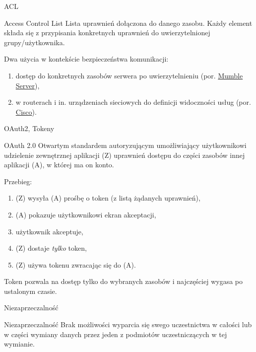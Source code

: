 \begin{frame}{ACL}
	
	\begin{alertblock}{Access Control List}
		Lista uprawnień dołączona do danego zasobu. Każdy element składa się z przypisania konkretnych uprawnień do uwierzytelnionej grupy/użytkownika.
	\end{alertblock}
	
	Dwa użycia w kontekście bezpieczeństwa komunikacji:
	\begin{enumerate}
		\item dostęp do konkretnych zasobów serwera po uwierzytelnieniu (por. \href{http://wiki.mumble.info/wiki/ACL_and_Groups/English}{Mumble Server}),
		\item w routerach i in. urządzeniach sieciowych do definicji widoczności usług (por. \href{http://www.cisco.com/c/en/us/td/docs/ios/12_2/security/configuration/guide/fsecur_c/scfacls.html}{Cisco}).
	\end{enumerate}
	
\end{frame}

\begin{frame}{OAuth2, Tokeny}
	
	\begin{alertblock}{OAuth 2.0}
		Otwartym standardem autoryzującym umożliwiający użytkownikowi udzielenie zewnętrznej aplikacji (Z) uprawnień dostępu do części zasobów innej aplikacji (A), w której ma on konto.
	\end{alertblock}
	
	Przebieg:
	\begin{enumerate}
		\item (Z) wysyła (A) prośbę o token (z listą żądanych uprawnień),
		\item (A) pokazuje użytkownikowi ekran akceptacji,
		\item użytkownik akceptuje,
		\item (Z) dostaje \emph{tylko} token,
		\item (Z) używa tokenu zwracając się do (A).
	\end{enumerate}
	
	Token pozwala na dostęp tylko do wybranych zasobów i najczęściej wygasa po ustalonym czasie.

\end{frame}

\begin{frame}{Niezaprzeczalność}
	
	\begin{alertblock}{Niezaprzeczalność}
		Brak możliwości wyparcia się swego uczestnictwa w całości lub w części wymiany danych przez jeden z podmiotów uczestniczących w tej wymianie.
	\end{alertblock}
	
\end{frame}

